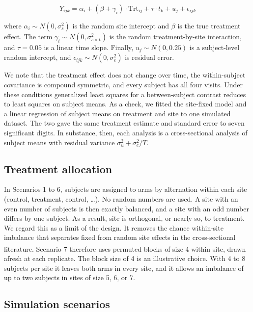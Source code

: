 \documentclass[
  11pt,
]{article}
\begin{document}
\[Y_{ijk} = \alpha_i + (\beta + \gamma_i) \cdot \text{Trt}_{ij}
  + \tau \cdot t_k + u_j + \epsilon_{ijk}\]

where \(\alpha_i \sim N(0, \sigma^2_s)\) is the random site
intercept and \(\beta\) is the true treatment effect. The term
\(\gamma_i \sim N(0, \sigma^2_{s \times t})\) is the random
treatment-by-site interaction, and \(\tau = 0.05\) is a linear time
slope. Finally, \(u_j \sim N(0, 0.25)\) is a subject-level random
intercept, and \(\epsilon_{ijk} \sim N(0, \sigma^2_e)\) is residual
error.

We note that the treatment effect does not change over time, the
within-subject covariance is compound symmetric, and every subject
has all four visits. Under these conditions generalized least
squares for a between-subject contrast reduces to least squares on
subject means. As a check, we fitted the site-fixed model and a
linear regression of subject means on treatment and site to one
simulated dataset. The two gave the same treatment estimate and
standard error to seven significant digits. In substance, then,
each analysis is a cross-sectional analysis of subject means with
residual variance \(\sigma^2_u + \sigma^2_e / T\).

\subsection{Treatment allocation}\label{treatment-allocation}

In Scenarios 1 to 6, subjects are assigned to arms by alternation
within each site (control, treatment, control, \ldots). No random
numbers are used. A site with an even number of subjects is then
exactly balanced, and a site with an odd number differs by one
subject. As a result, site is orthogonal, or nearly so, to
treatment. We regard this as a limit of the design. It removes the
chance within-site imbalance that separates fixed from random site
effects in the cross-sectional literature\textsuperscript{}.
Scenario 7 therefore uses permuted blocks of
size 4 within site, drawn afresh at each replicate. The block size
of 4 is an illustrative choice. With 4 to 8 subjects per site it
leaves both arms in every site, and it allows an imbalance of up to
two subjects in sites of size 5, 6, or 7.

\subsection{Simulation scenarios}\label{simulation-scenarios}
\end{document}
